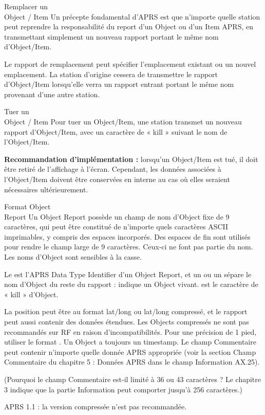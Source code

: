 \begin{aprssideblock}{Remplacer un\\Object / Item}
Un précepte fondamental d'APRS est que n'importe quelle station peut
reprendre la responsabilité du report d'un Object ou d'un Item APRS, en
transmettant simplement un nouveau rapport portant le même nom
d'Object/Item.

Le rapport de remplacement peut spécifier l'emplacement existant ou un
nouvel emplacement. La station d'origine cessera de transmettre le rapport
d'Object/Item lorsqu'elle verra un rapport entrant portant le même nom
provenant d'une autre station.
\end{aprssideblock}

\begin{aprssideblock}{Tuer un\\Object / Item}
Pour tuer un Object/Item, une station transmet un nouveau rapport
d'Object/Item, avec un caractère de « kill » suivant le nom de
l'Object/Item.

\textbf{Recommandation d'implémentation :} lorsqu'un Object/Item est tué,
il doit être retiré de l'affichage à l'écran. Cependant, les données
associées à l'Object/Item doivent être conservées en interne au cas où
elles seraient nécessaires ultérieurement.
\end{aprssideblock}

\par{}\par

\begin{aprssideblock}{Format Object\\Report}
Un Object Report possède un champ de nom d'Object fixe de 9 caractères,
qui peut être constitué de n'importe quels caractères ASCII imprimables, y
compris des espaces incorporés. Des espaces de fin sont utilisés pour
rendre le champ large de 9 caractères. Ceux-ci ne font pas partie du nom.
Les noms d'Object sont sensibles à la casse.

Le \lit{;} est l'APRS Data Type Identifier d'un Object Report, et un
\lit{*} ou un \lit{\_} sépare le nom d'Object du reste du rapport :
\lit{*} indique un Object vivant. \lit{\_} est le caractère de « kill »
d'Object.

La position peut être au format lat/long ou lat/long compressé, et le
rapport peut aussi contenir des données étendues. Les Objects compressés
ne sont pas recommandés sur RF en raison d'incompatibilités. Pour une
précision de 1 pied, utiliser le format . Un Object a toujours
un timestamp. Le champ Commentaire peut contenir n'importe quelle donnée
APRS appropriée (voir la section Champ Commentaire du chapitre 5 : Données
APRS dans le champ Information AX.25).

(Pourquoi le champ Commentaire est-il limité à 36 ou 43 caractères ? Le
chapitre 3 indique que la partie Information peut comporter jusqu'à 256
caractères.)

APRS 1.1 : la version compressée n'est pas recommandée.
\end{aprssideblock}

